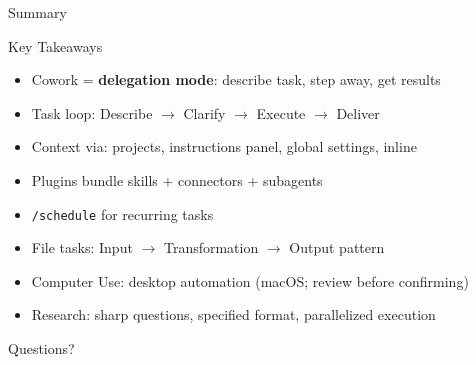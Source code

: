 \documentclass[aspectratio=169]{beamer}
\begin{document}
\begin{frame}{Summary}
\begin{block}{Key Takeaways}
\begin{itemize}
  \item Cowork = \textbf{delegation mode}: describe task, step away, get results
  \item Task loop: Describe $\to$ Clarify $\to$ Execute $\to$ Deliver
  \item Context via: projects, instructions panel, global settings, inline
  \item Plugins bundle skills + connectors + subagents
  \item \texttt{/schedule} for recurring tasks
  \item File tasks: Input $\to$ Transformation $\to$ Output pattern
  \item Computer Use: desktop automation (macOS; review before confirming)
  \item Research: sharp questions, specified format, parallelized execution
\end{itemize}
\end{block}

\vfill
\centering
\Large\color{popblue} Questions?
\end{frame}
\end{document}
